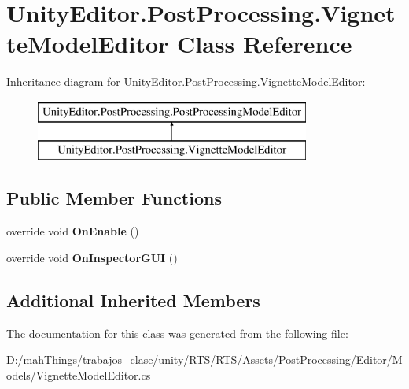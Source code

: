 \hypertarget{class_unity_editor_1_1_post_processing_1_1_vignette_model_editor}{}\section{Unity\+Editor.\+Post\+Processing.\+Vignette\+Model\+Editor Class Reference}
\label{class_unity_editor_1_1_post_processing_1_1_vignette_model_editor}
Inheritance diagram for Unity\+Editor.\+Post\+Processing.\+Vignette\+Model\+Editor\+:\begin{figure}[H]
\begin{center}
\leavevmode
\includegraphics[height=2.000000cm]{class_unity_editor_1_1_post_processing_1_1_vignette_model_editor}
\end{center}
\end{figure}
\subsection*{Public Member Functions}
\begin{DoxyCompactItemize}
\item 
\mbox{\label{class_unity_editor_1_1_post_processing_1_1_vignette_model_editor_aa8b2441f6cd3fcd3f34c88d03a24be18}} 
override void {\bfseries On\+Enable} ()
\item 
\mbox{\label{class_unity_editor_1_1_post_processing_1_1_vignette_model_editor_ad058e20158c114d74518f6b0268789d6}} 
override void {\bfseries On\+Inspector\+G\+UI} ()
\end{DoxyCompactItemize}
\subsection*{Additional Inherited Members}


The documentation for this class was generated from the following file\+:\begin{DoxyCompactItemize}
\item 
D\+:/mah\+Things/trabajos\+\_\+clase/unity/\+R\+T\+S/\+R\+T\+S/\+Assets/\+Post\+Processing/\+Editor/\+Models/Vignette\+Model\+Editor.\+cs\end{DoxyCompactItemize}

